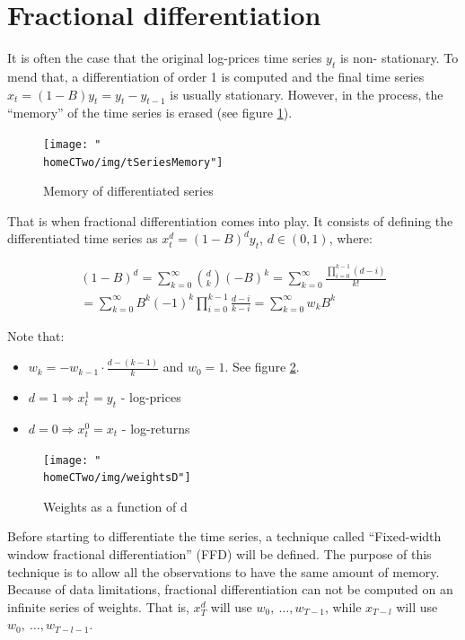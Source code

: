 \documentclass[a4paper]{article}
\newcommand{\homeCTwo}{../../Chapter 2 - FracDiff/Draft}
\begin{document}
\section{Fractional differentiation}
\label{sec:fracDiff}
It is often the case that the original log-prices time series $y_t$ is non-
stationary. To mend that, a differentiation of order 1 is computed and the 
final time series $x_t = (1 - B) y_t = y_t - y_{t-1}$ is usually stationary. 
However, in the process, the ``memory'' of the time series is erased (see 
figure \ref{fig:tSeriesMemory}).\\

\begin{figure}[hbtp]
\centering
	\texttt{[image: "\\homeCTwo/img/tSeriesMemory"]}
	\caption{Memory of differentiated series}
	\label{fig:tSeriesMemory}
\end{figure}

That is when fractional differentiation comes into play. It consists of 
defining the differentiated time series as $x_t^d = (1 - B)^d y_t$, 
$d \in (0,1)$, where:

\begin{align*}
	(1 - B)^d = \sum_{k = 0}^{\infty} \binom{d}{k} (-B)^k = 
	\sum_{k = 0}^{\infty} \frac{\prod_{i = 0}^{k - 1} (d - i)}{k!}\\
	= \sum_{k = 0}^{\infty} B^k (-1)^k \prod_{i = 0}^{k - 1} 
	\frac{d - i}{k - i} = \sum_{k = 0}^{\infty} w_k B^k
\end{align*}

Note that:
\begin{itemize}
	\item $w_k = -w_{k - 1} \cdot \frac{d - (k - 1)}{k}$ and $w_0 = 1$. See 
	figure \ref{fig:weightsD}. 
	\item $d = 1 \Rightarrow x_t^1 = y_t$ - log-prices
	\item $d = 0 \Rightarrow x_t^0 = x_t$ - log-returns
\end{itemize}

\begin{figure}[htbp]
\centering
	\texttt{[image: "\\homeCTwo/img/weightsD"]}
	\caption{Weights as a function of d}
	\label{fig:weightsD}
\end{figure}

Before starting to differentiate the time series, a technique called 
``Fixed-width window fractional differentiation'' (FFD) will be defined. The 
purpose of this technique is to allow all the observations to have the same 
amount of memory. Because of data limitations, fractional differentiation 
can not be computed on an infinite series of weights. That is, $x_T^d$ will 
use $w_0,\ \ldots , w_{T - 1}$, while $x_{T - l}$ will use 
$w_0,\ \ldots , w_{T - l - 1}$.\\
\end{document}

